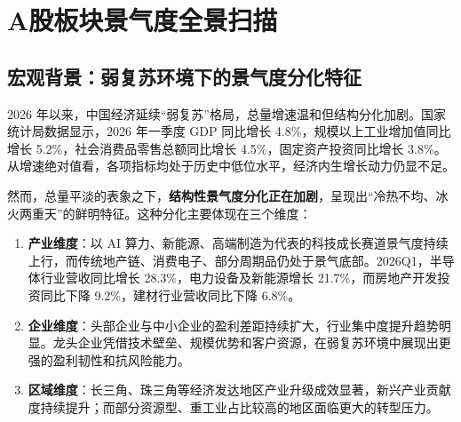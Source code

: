 
\chapter{A股板块景气度全景扫描}

\section{宏观背景：弱复苏环境下的景气度分化特征}

2026 年以来，中国经济延续``弱复苏''格局，总量增速温和但结构分化加剧。国家统计局数据显示，2026 年一季度 GDP 同比增长 4.8\%，规模以上工业增加值同比增长 5.2\%，社会消费品零售总额同比增长 4.5\%，固定资产投资同比增长 3.8\%。从增速绝对值看，各项指标均处于历史中低位水平，经济内生增长动力仍显不足。

\smallskip

然而，总量平淡的表象之下，\textbf{结构性景气度分化正在加剧}，呈现出``冷热不均、冰火两重天''的鲜明特征。这种分化主要体现在三个维度：

\begin{enumerate}[leftmargin=2em]
\item \textbf{产业维度}：以 AI 算力、新能源、高端制造为代表的科技成长赛道景气度持续上行，而传统地产链、消费电子、部分周期品仍处于景气底部。2026Q1，半导体行业营收同比增长 28.3\%，电力设备及新能源增长 21.7\%，而房地产开发投资同比下降 9.2\%，建材行业营收同比下降 6.8\%。
\item \textbf{企业维度}：头部企业与中小企业的盈利差距持续扩大，行业集中度提升趋势明显。龙头企业凭借技术壁垒、规模优势和客户资源，在弱复苏环境中展现出更强的盈利韧性和抗风险能力。
\item \textbf{区域维度}：长三角、珠三角等经济发达地区产业升级成效显著，新兴产业贡献度持续提升；而部分资源型、重工业占比较高的地区面临更大的转型压力。
\end{enumerate}

